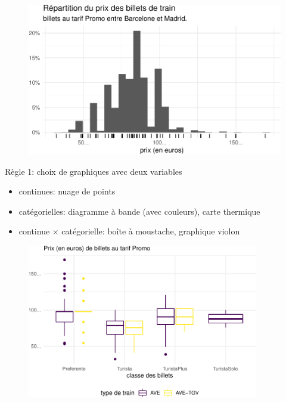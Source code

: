 \documentclass[
  ignorenonframetext,
]{beamer}
\providecommand{\tightlist}{%
  \setlength{\itemsep}{0pt}\setlength{\parskip}{0pt}}\usepackage{longtable,booktabs,array}
\begin{document}
\begin{frame}
\begin{figure}

{\centering \includegraphics{MATH60602-diapos1_files/figure-beamer/renfe_hist-1.pdf}

}

\end{figure}
\end{frame}

\begin{frame}{Règle 1: choix de graphiques avec deux variables}
\protect\hypertarget{ruxe8gle-1-choix-de-graphiques-avec-deux-variables}{}
\begin{itemize}
\tightlist
\item
  continues: nuage de points
\item
  catégorielles: diagramme à bande (avec couleurs), carte thermique
\item
  continue \(\times\) catégorielle: boîte à moustache, graphique violon
\end{itemize}
\end{frame}

\begin{frame}
\begin{figure}

{\centering \includegraphics[width=0.9\textwidth,height=\textheight]{MATH60602-diapos1_files/figure-beamer/renfe_boxplot-1.pdf}

}

\end{figure}
\end{frame}
\end{document}
